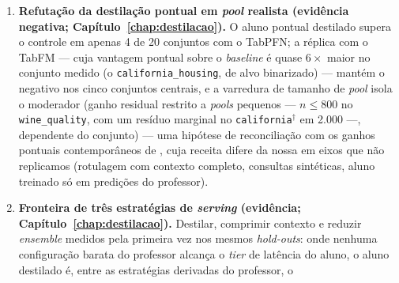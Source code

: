 \begin{enumerate}
\begin{enumerate}
    quantis \emph{de um professor foundation model tabular} para um
    aluno GBDT, avaliando por CRPS e cobertura --- foi verificado como
    sem trabalho \emph{acadêmico} anterior nas buscas datadas deste
    estudo, de julho a novembro de 2026 (registro completo no
    Apêndice~\ref{app:suplementares}; um
    repositório público de setembro de 2026 --- referenciado na
    Seção~\ref{sec:rel-destilacao} --- destila o TabFM em XGBoost
    para classificação e regressão \emph{pontual}, sem tocar o recorte
    distribucional --- a linhagem não tabular de destilação
    distribucional é citada como antecedente na
    Seção~\ref{sec:rel-destilacao}). A evidência: retenção mediana de
    12\% a 19\% do gap de CRPS, conforme o ajuste dos braços,
    positiva em 16 de 20 conjuntos ($p=0{,}006$ em estágio único,
    $p\approx0{,}019$ sob
    a correção sequencial; probabilidade posterior
    bayesiana de 0,96 de a região positiva ser a mais provável, com
    massa posterior esperada nela de 0,70), incluindo um aluno
    \emph{born-again} (que iguala o próprio professor, a menos de
    $10^{-4}$ de CRPS), servindo na
    casa de cem microssegundos por linha.
  \item \textbf{Refutação da destilação pontual em \emph{pool} realista
    (evidência negativa; Capítulo~\ref{chap:destilacao}).} O aluno
    pontual destilado supera o controle em apenas 4 de 20 conjuntos
    com o TabPFN; a réplica com o TabFM --- cuja vantagem
    pontual sobre o \emph{baseline} é quase $6\times$ maior no
    conjunto medido (o \texttt{california\_housing}, de alvo
    binarizado) --- mantém o negativo nos cinco conjuntos centrais, e a
    varredura de tamanho de \emph{pool} isola o
    moderador (ganho residual restrito a \emph{pools} pequenos ---
    $n \leq 800$ no \texttt{wine\_quality}, com um resíduo marginal
    no \texttt{california}$^\dagger$ em 2.000 ---, dependente do
    conjunto) --- uma hipótese de reconciliação com os ganhos pontuais
    contemporâneos de \citet{jeong2026}, cuja receita difere da nossa
    em eixos que não replicamos (rotulagem com contexto completo,
    consultas sintéticas, aluno treinado só em predições do
    professor).
  \item \textbf{Fronteira de três estratégias de \emph{serving}
    (evidência; Capítulo~\ref{chap:destilacao}).} Destilar, comprimir
    contexto e reduzir \emph{ensemble} medidos pela primeira vez nos
    mesmos \emph{hold-outs}: onde nenhuma configuração barata do
    professor alcança o \emph{tier} de latência do aluno, o
    aluno destilado é, entre as estratégias derivadas do professor, o

\end{enumerate}
\end{enumerate}
